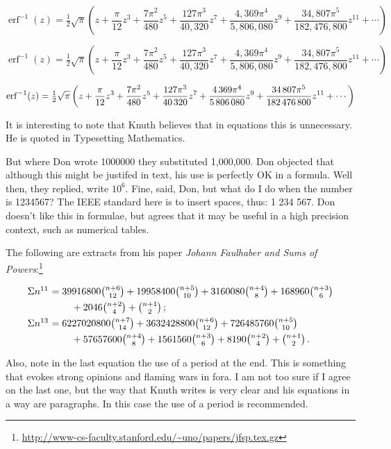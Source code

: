 {\[
\operatorname{erf}^{-1}(z)=\tfrac{1}{2}\sqrt{\pi}\left (z+\frac{\pi}{12}z^3+\frac{7\pi^2}{480}z^5+\frac{127\pi^3}{40,320}z^7+\frac{4,369\pi^4}{5,806,080}z^9+\frac{34,807\pi^5}{182,476,800}z^{11}+\cdots\right )
\]

\[
\operatorname{erf}^{-1}(z)=\tfrac{1}{2}\sqrt{\pi}\left (z+\frac{\pi}{12}z^3+\frac{7\pi^2}{480}z^5+\frac{127\pi^3}{40{,}320}z^7+\frac{4{,}369\pi^4}{5{,}806{,}080}z^9+\frac{34{,}807\pi^5}{182{,}476,800}z^{11}+\cdots\right )
\]



\[
\operatorname{erf}^{-1}(z)=\tfrac{1}{2}\sqrt{\pi}\left (z+\frac{\pi}{12}z^3+\frac{7\pi^2}{480}z^5+\frac{127\pi^3}{40\thinspace 320}z^7+\frac{4\thinspace 369\pi^4}{5\thinspace 806\thinspace 080}z^9+\frac{34\thinspace 807\pi^5}{182\thinspace 476\thinspace 800}z^{11}+\cdots\right )
\]


It is interesting to note that Knuth believes that in equations this is unnecessary.
He is quoted in Typesetting Mathematics.


\begin{latexquotation}
But where Don wrote 1000000 they substituted
1,000,000. Don objected that although this might be justifed in text, his use is perfectly OK in a formula. Well then, they replied, write \(10^6\).
Fine, said, Don, but what do I do 
when the number is 1234567? The IEEE standard here is to insert spaces, thus: 1 234 567.
Don doesn't like this in formulae, but agrees that it may be useful in a high precision context, such as numerical tables. 
\end{latexquotation}



The following are extracts from his paper \textit{Johann Faulhaber and Sums of Powers}:\footnote{\url{http://www-cs-faculty.stanford.edu/~uno/papers/jfsp.tex.gz}}

{
\[\vcenter{\halign{$#$\hfil\ &$#$\hfil\cr
\Sigma n^{11}&=39916800{n+6\choose 12}+
19958400{n+5\choose 10}+3160080{n+4\choose 8}
+168960{n+3\choose 6}\cr
\noalign{\smallskip}
&\qquad\null+2046{n+2\choose 4}+{n+1\choose 2}\,;\cr
\noalign{\smallskip}
\Sigma n^{13}&=6227020800{n+7\choose 14}+3632428800{n+6\choose 12}+
726485760{n+5\choose 10}\cr
\noalign{\smallskip}
&\qquad\null+57657600{n+4\choose 8}
+1561560{n+3\choose 6}+8190{n+2\choose 4}+\binom{n+1}{2}\,.\cr}}\]
}

Also, note in the last equation the use of a period at the end. 
This is something that evokes strong opinions and flaming wars in fora. 
I am not too sure if I agree on the last one, but the way that Knuth writes 
is very clear and his equations in a way are paragraphs. 
In this case the use of a period is recommended.


}
